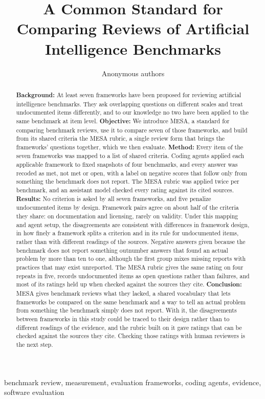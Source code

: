 \documentclass[10pt,conference]{IEEEtran}
\begin{document}
\title{A Common Standard for Comparing Reviews of Artificial Intelligence Benchmarks}
\author{Anonymous authors}
\maketitle
\begin{abstract}
\textbf{Background:} At least seven frameworks have been proposed for reviewing artificial intelligence benchmarks. They ask overlapping questions on different scales and treat undocumented items differently, and to our knowledge no two have been applied to the same benchmark at item level.
\textbf{Objective:} We introduce MESA, a standard for comparing benchmark reviews, use it to compare seven of those frameworks, and build from its shared criteria the MESA rubric, a single review form that brings the frameworks' questions together, which we then evaluate.
\textbf{Method:} Every item of the seven frameworks was mapped to a list of shared criteria. Coding agents applied each applicable framework to fixed snapshots of four benchmarks, and every answer was recoded as met, not met or open, with a label on negative scores that follow only from something the benchmark does not report. The MESA rubric was applied twice per benchmark, and an assistant model checked every rating against its cited sources.
\textbf{Results:} No criterion is asked by all seven frameworks, and five penalize undocumented items by design. Framework pairs agree on about half of the criteria they share: on documentation and licensing, rarely on validity. Under this mapping and agent setup, the disagreements are consistent with differences in framework design, in how finely a framework splits a criterion and in its rule for undocumented items, rather than with different readings of the sources. Negative answers given because the benchmark does not report something outnumber answers that found an actual problem by more than ten to one, although the first group mixes missing reports with practices that may exist unreported. The MESA rubric gives the same rating on four repeats in five, records undocumented items as open questions rather than failures, and most of its ratings held up when checked against the sources they cite.
\textbf{Conclusion:} MESA gives benchmark reviews what they lacked, a shared vocabulary that lets frameworks be compared on the same benchmark and a way to tell an actual problem from something the benchmark simply does not report. With it, the disagreements between frameworks in this study could be traced to their design rather than to different readings of the evidence, and the rubric built on it gave ratings that can be checked against the sources they cite. Checking those ratings with human reviewers is the next step.
\end{abstract}
\begin{IEEEkeywords}
benchmark review, measurement, evaluation frameworks, coding agents, evidence, software evaluation
\end{IEEEkeywords}
\end{document}
